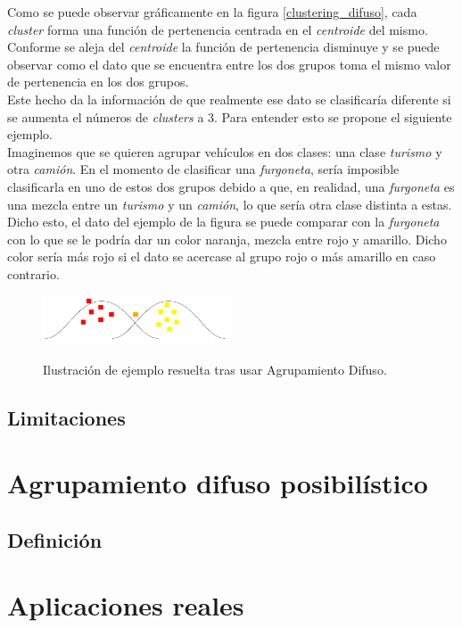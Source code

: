 \documentclass[]{report}
\begin{document}
			Como se puede observar gráficamente en la figura \ref{clustering_difuso}, cada \textit{cluster} forma una función de pertenencia centrada en el \textit{centroide} del mismo. Conforme se aleja del \textit{centroide} la función de pertenencia disminuye y se puede observar como el dato que se encuentra entre los dos grupos toma el mismo valor de pertenencia en los dos grupos.\\
			
			Este hecho da la información de que realmente ese dato se clasificaría diferente si se aumenta el números de \textit{clusters} a 3. Para entender esto se propone el siguiente ejemplo.\\
			
			Imaginemos que se quieren agrupar vehículos en dos clases: una clase \textit{turismo} y otra \textit{camión}. En el momento de clasificar una \textit{furgoneta}, sería imposible clasificarla en uno de estos dos grupos debido a que, en realidad, una \textit{furgoneta} es una mezcla entre un \textit{turismo} y un \textit{camión}, lo que sería otra clase distinta a estas.\\
			
			Dicho esto, el dato del ejemplo de la figura se puede comparar con la \textit{furgoneta} con lo que se le podría dar un color naranja, mezcla entre rojo y amarillo. Dicho color sería más rojo si el dato se acercase al grupo rojo o más amarillo en caso contrario.
			
			\begin{figure}[h]
				\centering
				\includegraphics[width=0.5\textwidth]{clustering_difuso_solucion.jpg}
				\label{clustering_difuso_solucion}
				\caption{Ilustración de ejemplo resuelta tras usar Agrupamiento Difuso.}
			\end{figure}
		
		\section{Limitaciones}
	
	\chapter{Agrupamiento difuso posibilístico}
	
		\section{Definición}
	
	\chapter{Aplicaciones reales}
	


\end{document}

